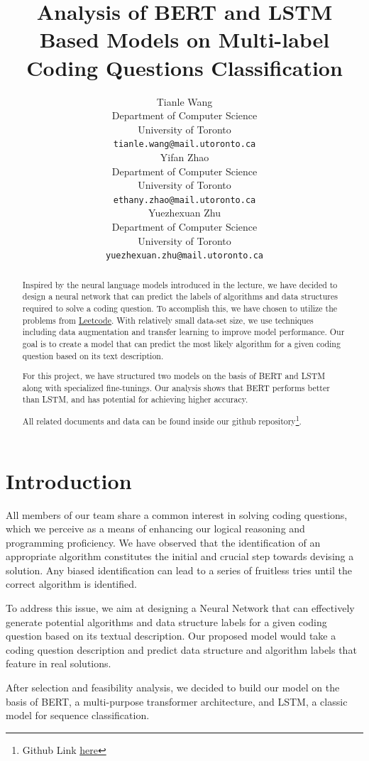 \documentclass{article}
\title{Analysis of BERT and LSTM Based Models on Multi-label Coding Questions Classification}
\author{%
  Tianle Wang \\
  Department of Computer Science\\
  University of Toronto\\
  \texttt{tianle.wang@mail.utoronto.ca} \\
  \And Yifan Zhao \\
  Department of Computer Science\\ 
  University of Toronto\\
  \texttt{ethany.zhao@mail.utoronto.ca} \\
  \And Yuezhexuan Zhu \\
  Department of Computer Science\\
  University of Toronto\\
  \texttt{yuezhexuan.zhu@mail.utoronto.ca} \\
}
\begin{document}
\maketitle
\begin{abstract}
Inspired by the neural language models introduced in the lecture, we have decided to design a neural network that can predict the labels of algorithms and data structures required to solve a coding question. To accomplish this, we have chosen to utilize the problems from \href{https://leetcode.com/}{Leetcode}. With relatively small data-set size, we use techniques including data augmentation and transfer learning to improve model performance. Our goal is to create a model that can predict the most likely algorithm for a given coding question based on its text description. 

For this project, we have structured two models on the basis of BERT\cite{BERT} and LSTM\cite{LSTM} along with specialized fine-tunings. Our analysis shows that BERT performs better than LSTM, and has potential for achieving higher accuracy. 

All related documents and data can be found inside our github repository\footnote{Github Link \href{https://github.com/XFTTech/CSC413-Project}{here}}.
\end{abstract}
\section{Introduction}
All members of our team share a common interest in solving coding questions, which we perceive as a means of enhancing our logical reasoning and programming proficiency. We have observed that the identification of an appropriate algorithm constitutes the initial and crucial step towards devising a solution. Any biased identification can lead to a series of fruitless tries until the correct algorithm is identified.

To address this issue, we aim at designing a Neural Network that can effectively generate potential algorithms and data structure labels for a given coding question based on its textual description. Our proposed model would take a coding question description and predict data structure and algorithm labels that feature in real solutions.

After selection and feasibility analysis, we decided to build our model on the basis of BERT\cite{BERT}, a multi-purpose transformer architecture, and LSTM\cite{LSTM}, a classic model for sequence classification. 
\end{document}
